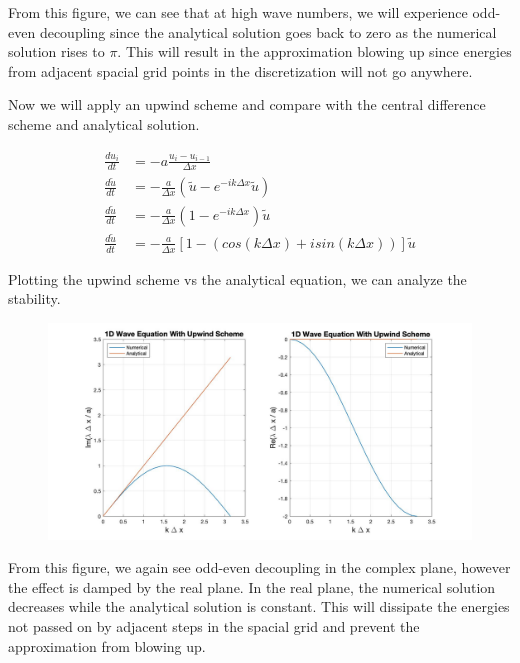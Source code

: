 \documentclass[10pt]{article}
\begin{document}
	From this figure, we can see that at high wave numbers, we will experience odd-even decoupling since the analytical solution goes back to zero as the numerical solution rises to $\pi$. This will result in the approximation blowing up since energies from adjacent spacial grid points in the discretization will not go anywhere.
	
	Now we will apply an upwind scheme and compare with the central difference scheme and analytical solution.
	
	\begin{equation} \label{1D_wave_semi2}
		\begin{aligned}
			\frac{du_i}{dt} &= - a \frac{u_{i} - u_{i-1}}{\Delta x} \\
			\frac{d \tilde u}{dt} &= - \frac{a}{\Delta x} \left( \tilde{u} - e^{-ik \Delta x} \tilde{u} \right) \\
			\frac{d \tilde u}{dt} &= - \frac{a}{\Delta x} \left( 1- e^{-ik \Delta x} \right) \tilde{u} \\
			\frac{d \tilde u}{dt} &= - \frac{a}{\Delta x} \left[ 1 - (cos(k \Delta x) + i sin(k \Delta x)) \right] \tilde{u} 
		\end{aligned}
	\end{equation}
	
	Plotting the upwind scheme vs the analytical equation, we can analyze the stability.
	
	\begin{figure}[h]
		\includegraphics[width=16cm]{wave_upwind}
		\centering
	\end{figure}

	From this figure, we again see odd-even decoupling in the complex plane, however the effect is damped by the real plane. In the real plane, the numerical solution decreases while the analytical solution is constant. This will dissipate the energies not passed on by adjacent steps in the spacial grid and prevent the approximation from blowing up.
	
\end{document}
